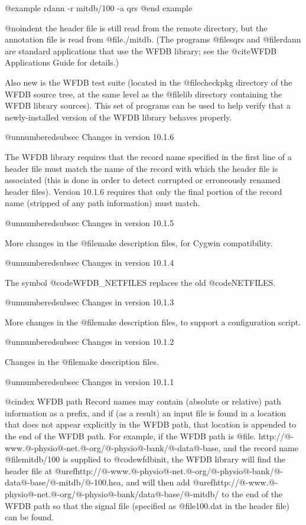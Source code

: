 @example
rdann -r mitdb/100 -a qrs
@end example

@noindent
the header file is still read from the remote directory, but the annotation
file is read from @file{./mitdb}.  (The programs @file{sqrs} and @file{rdann}
are standard applications that use the WFDB library;  see the @cite{WFDB
Applications Guide} for details.)

Also new is the WFDB test suite (located in the @file{checkpkg} directory of
the WFDB source tree, at the same level as the @file{lib} directory containing
the WFDB library sources).  This set of programs can be used to help verify
that a newly-installed version of the WFDB library behaves properly.

@unnumberedsubsec Changes in version 10.1.6

The WFDB library requires that the record name specified in the first line
of a header file must match the name of the record with which the header file
is associated (this is done in order to detect corrupted or erroneously
renamed header files).  Version 10.1.6 requires that only the final portion of
the record name (stripped of any path information) must match.

@unnumberedsubsec Changes in version 10.1.5

More changes in the @file{make} description files, for Cygwin compatibility.

@unnumberedsubsec Changes in version 10.1.4

The symbol @code{WFDB_NETFILES} replaces the old @code{NETFILES}.

@unnumberedsubsec Changes in version 10.1.3

More changes in the @file{make} description files, to support a configuration
script.

@unnumberedsubsec Changes in version 10.1.2

Changes in the @file{make} description files.

@unnumberedsubsec Changes in version 10.1.1

@cindex WFDB path
Record names may contain (absolute or relative) path information as a prefix,
and if (as a result) an input file is found in a location that does not appear
explicitly in the WFDB path, that location is appended to the end of the WFDB
path.  For example, if the WFDB path is
@file{. http://@-www.@-physio@-net.@-org/@-physio@-bank/@-data@-base}, and the
record name @file{mitdb/100} is supplied to @code{wfdbinit}, the WFDB library
will find the header file at
@uref{http://@-www.@-physio@-net.@-org/@-physio@-bank/@-data@-base/@-mitdb/@-100.hea},
and will then add @uref{http://@-www.@-physio@-net.@-org/@-physio@-bank/data@-base/@-mitdb/} to
the end of the WFDB path so that the signal file (specified as @file{100.dat}
in the header file) can be found.

